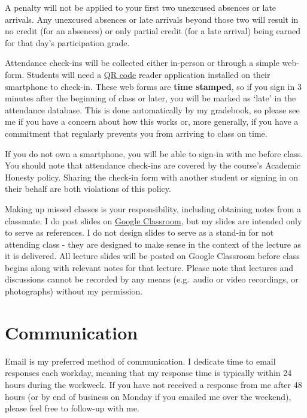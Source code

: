 \documentclass[]{book}
\begin{document}
A penalty will not be applied to your first two unexcused absences or late arrivals. Any unexcused absences or late arrivals beyond those two will result in no credit (for an absences) or only partial credit (for a late arrival) being earned for that day's participation grade.

Attendance check-ins will be collected either in-person or through a simple web-form. Students will need a \href{https://en.wikipedia.org/wiki/QR_code}{QR code} reader application installed on their smartphone to check-in. These web forms are \textbf{time stamped}, so if you sign in 3 minutes after the beginning of class or later, you will be marked as `late' in the attendance database. This is done automatically by my gradebook, so please see me if you have a concern about how this works or, more generally, if you have a commitment that regularly prevents you from arriving to class on time.

If you do not own a smartphone, you will be able to sign-in with me before class. You should note that attendance check-ins are covered by the course's Academic Honesty policy. Sharing the check-in form with another student or signing in on their behalf are both violations of this policy.

Making up missed classes is your responsibility, including obtaining notes from a classmate. I do post slides on \href{https://classroom.google.com}{Google Classroom}, but my slides are intended only to serve as references. I do not design slides to serve as a stand-in for not attending class - they are designed to make sense in the context of the lecture as it is delivered. All lecture slides will be posted on Google Classroom before class begins along with relevant notes for that lecture. Please note that lectures and discussions cannot be recorded by any means (e.g.~audio or video recordings, or photographs) without my permission.

\hypertarget{communication}{%
\section{Communication}\label{communication}}

Email is my preferred method of communication. I dedicate time to email responses each workday, meaning that my response time is typically within 24 hours during the workweek. If you have not received a response from me after 48 hours (or by end of business on Monday if you emailed me over the weekend), please feel free to follow-up with me.
\end{document}
